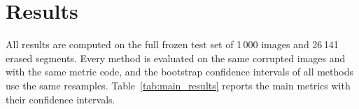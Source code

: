 \documentclass[pdflatex,sn-mathphys-num]{sn-jnl}%
\begin{document}
\section{Results}
\label{sec:results}

All results are computed on the full frozen test set of 1\,000 images and 26\,141
erased segments. Every method is evaluated on the same corrupted images and with the
same metric code, and the bootstrap confidence intervals of all methods use the same
resamples. Table~\ref{tab:main_results} reports the main metrics with their
confidence intervals.

\newsavebox{\mainresultsbox}
\end{document}
